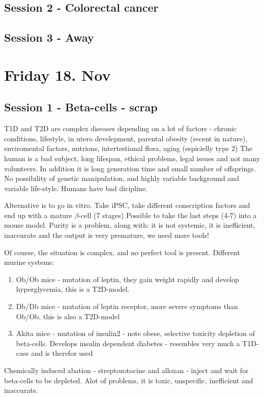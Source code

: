 \documentclass[12p]{article}
\begin{document}
\subsection*{Session 2 - Colorectal cancer}
\subsection*{Session 3 - Away}
\section*{Friday 18. Nov}
\subsection*{Session 1 - Beta-cells - scrap}

T1D and T2D are complex diseases depending on a lot of factors - chronic conditions, lifestyle, in utero develepment, parental obesity (recent in nature), enviromental factors, nutrions, intertestional flora, aging (espicielly type 2)
The human is a bad subject, long lifespan, ethical problems, legal issues and not many volunteers.
In addition it is long generation time and small number of offsprings.
No possibility of genetic manipulation, and highly variable background and variable life-style.
Humans have bad dicipline.

Alternative is to go in vitro.
Take iPSC, take different conscription factors and end up with a mature $\beta$-cell (7 stages)
Possible to take the last steps (4-7) into a mouse model.
Purity is a problem, along with: it is not systemic, it is inefficient, inaccurate and the output is very premature, we need more tools!

Of course, the situation is complex, and no perfect tool is present.
Different murine systems:

\begin{enumerate}
    \item
	Ob/Ob mice - mutation of leptin, they gain weight rapidly and develop hyperglycemia, this is a T2D-model.
    \item
	Db/Db mice - mutation of leptin receptor, more severe symptoms than Ob/Ob, this is also a T2D-model
    \item
	Akita mice - mutation of insulin2 - note obese, selective toxicity depletion of beta-cells. Develops insulin dependent diabetes - resembles very much a T1D-case and is therefor used 
\end{enumerate}

Chemically induced abation - streptozotocine and alloxan - inject and wait for beta-cells to be depleted.
Alot of problems, it is toxic, unspecific, inefficient and inaccurate.
\end{document}
